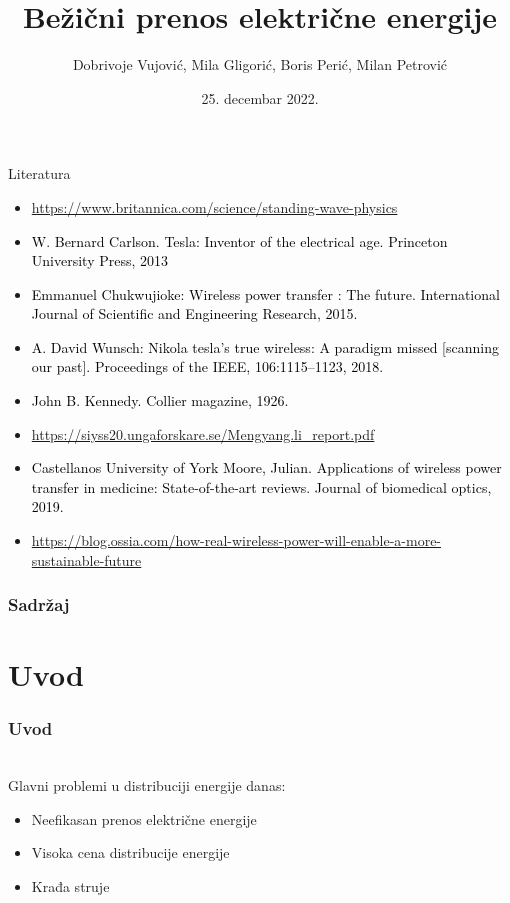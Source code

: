 \documentclass[10pt]{beamer}
\title{Bežični prenos električne energije}
\author{Dobrivoje Vujović, Mila Gligorić, Boris Perić, Milan Petrović}
\institute{Matematički fakultet Univerziteta u Beogradu}
\date{
	\footnotesize{25. decembar 2022.}	
}
\begin{document}
\begin{frame}
	\thispagestyle{empty}
	\titlepage
\end{frame}

\addtocounter{framenumber}{-1}

\begin{frame}{Literatura}
	\begin{itemize}
		
 	\item \textcolor{black}{{\footnotesize}}{\footnotesize \url{https://www.britannica.com/science/standing-wave-physics}}
	\item \textcolor{black}{{\footnotesize W. Bernard Carlson. Tesla: Inventor of the electrical age. Princeton University Press, 2013}}
	\item \textcolor{black}{{\footnotesize Emmanuel Chukwujioke: Wireless power transfer : The future. International Journal of Scientiﬁc and Engineering Research, 2015.}}
	\item \textcolor{black}{{\footnotesize A. David Wunsch:  Nikola tesla’s true wireless: A paradigm missed [scanning our past]. Proceedings of the IEEE, 106:1115–1123, 2018.}}
	\item \textcolor{black}{{\footnotesize John B. Kennedy. Collier magazine, 1926.}}
	\item \textcolor{black}{{\footnotesize}} {\footnotesize \url{https://siyss20.ungaforskare.se/Mengyang.li_report.pdf}}		
	\item \textcolor{black}{{\footnotesize Castellanos University of York Moore, Julian. Applications of wireless power transfer in medicine: State-of-the-art reviews. Journal of biomedical optics, 2019.}}
	\item \textcolor{black}{{\footnotesize}} {\footnotesize \url{https://blog.ossia.com/how-real-wireless-power-will-enable-a-more-sustainable-future}}		
	\end{itemize}
\end{frame}

\begin{frame}
	\frametitle{Sadržaj} %
	\tableofcontents[hidesubsections] 
\end{frame}

\section{Uvod}

\begin{frame}\frametitle{Uvod}
	\\Glavni problemi u distribuciji energije danas:\\
	\begin{itemize}	
		\item Neefikasan prenos električne energije
		\item Visoka cena distribucije energije
		\item Krađa struje
	\end{itemize}
\end{frame}
\end{document}
